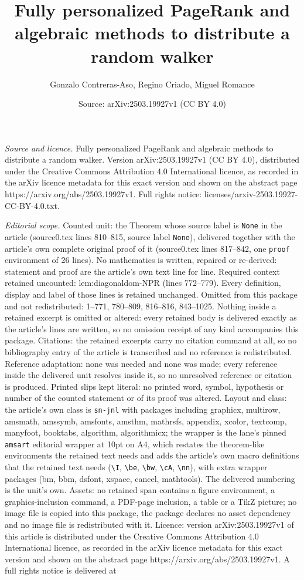 \documentclass[10pt,a4paper]{amsart}
\title[Fully personalized PageRank and algebraic methods to distrib]{Fully personalized PageRank and algebraic methods to distribute a random walker}
\author{Gonzalo Contreras-Aso, Regino Criado, Miguel Romance}
\date{Source: arXiv:2503.19927v1 (CC BY 4.0)}
\begin{document}
\maketitle

\noindent\emph{Source and licence.} Fully personalized PageRank and algebraic methods to distribute a random walker. Version arXiv:2503.19927v1 (CC BY 4.0), distributed under the Creative Commons Attribution 4.0 International licence, as recorded in the arXiv licence metadata for this exact version and shown on the abstract page https://arxiv.org/abs/2503.19927v1. Full rights notice: licenses/arxiv-2503.19927-CC-BY-4.0.txt.\par\smallskip

\noindent\textit{Editorial scope.} Counted unit: the Theorem whose source label is \texttt{None} in the article (source0.tex lines 810--815, source label \texttt{None}), delivered together with the article's own complete original proof of it (source0.tex lines 817--842, one \texttt{proof} environment of 26 lines). No mathematics is written, repaired or re-derived: statement and proof are the article's own text line for line. Required context retained uncounted: lem:diagonaldom-NPR (lines 772--779). Every definition, display and label of those lines is retained unchanged. Omitted from this package and not redistributed: 1--771, 780--809, 816--816, 843--1025. Nothing inside a retained excerpt is omitted or altered: every retained body is delivered exactly as the article's lines are written, so no omission receipt of any kind accompanies this package. Citations: the retained excerpts carry no citation command at all, so no bibliography entry of the article is transcribed and no reference is redistributed. Reference adaptation: none was needed and none was made; every reference inside the delivered unit resolves inside it, so no unresolved reference or citation is produced. Printed slips kept literal: no printed word, symbol, hypothesis or number of the counted statement or of its proof was altered. Layout and class: the article's own class is \texttt{sn-jnl} with packages including graphicx, multirow, amsmath, amssymb, amsfonts, amsthm, mathrsfs, appendix, xcolor, textcomp, manyfoot, booktabs, algorithm, algorithmicx; the wrapper is the lane's pinned \texttt{amsart} editorial wrapper at 10pt on A4, which restates the theorem-like environments the retained text needs and adds the article's own macro definitions that the retained text needs (\texttt{\textbackslash I}, \texttt{\textbackslash be}, \texttt{\textbackslash bw}, \texttt{\textbackslash cA}, \texttt{\textbackslash nn}), with extra wrapper packages (bm, bbm, dsfont, xspace, cancel, mathtools). The delivered numbering is the unit's own. Assets: no retained span contains a figure environment, a graphics-inclusion command, a PDF-page inclusion, a table or a TikZ picture; no image file is copied into this package, the package declares no asset dependency and no image file is redistributed with it. Licence: version arXiv:2503.19927v1 of this article is distributed under the Creative Commons Attribution 4.0 International licence, as recorded in the arXiv licence metadata for this exact version and shown on the abstract page https://arxiv.org/abs/2503.19927v1. A full rights notice is delivered at 
\end{document}
